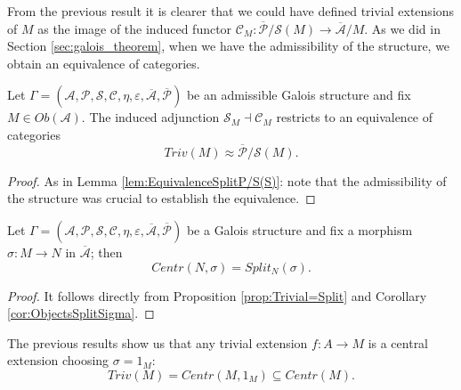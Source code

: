 From the previous result it is clearer that we could have defined trivial extensions of $M$ as the image of the induced functor $\mathcal{C}_M:\overline{\mathcal{P}}/\mathcal{S}(M)\longrightarrow\overline{\mathcal{A}}/M$. As we did in Section \ref{sec:galois_theorem}, when we have the admissibility of the structure, we obtain an equivalence of categories.
\begin{corollary}
\label{cor:Triv=P/SM}
    Let $\Gamma = (\mathcal{A}, \mathcal{P}, \mathcal{S}, \mathcal{C}, \eta, \varepsilon, \overline{\mathcal{A}}, \overline{\mathcal{P}})$ be an admissible Galois structure and fix $M\in Ob(\mathcal{A})$. The induced adjunction $\mathcal{S}_M\dashv\mathcal{C}_M$ restricts to an equivalence of categories
    \[ Triv(M)\approx \overline{\mathcal{P}}/\mathcal{S}(M). \]
    \begin{proof}
        As in Lemma \ref{lem:EquivalenceSplitP/S(S)}: note that the admissibility of the structure was crucial to establish the equivalence.
    \end{proof}
\end{corollary}
\begin{corollary}
\label{cor:Central=Split}
    Let $\Gamma = (\mathcal{A}, \mathcal{P}, \mathcal{S}, \mathcal{C}, \eta, \varepsilon, \overline{\mathcal{A}}, \overline{\mathcal{P}})$ be a Galois structure and fix a morphism $\sigma:M\to N$ in $\overline{\mathcal{A}}$; then 
    \[ Centr(N,\sigma)=Split_N(\sigma). \]
    \begin{proof}
        It follows directly from Proposition \ref{prop:Trivial=Split} and Corollary \ref{cor:ObjectsSplitSigma}.
    \end{proof}
\end{corollary}
\begin{oss*}
    The previous results show us that any trivial extension $f:A\to M$ is a central extension choosing $\sigma=1_M$:
    \[ Triv(M) = Centr(M,1_M)\subseteq Centr(M). \]
\end{oss*}


